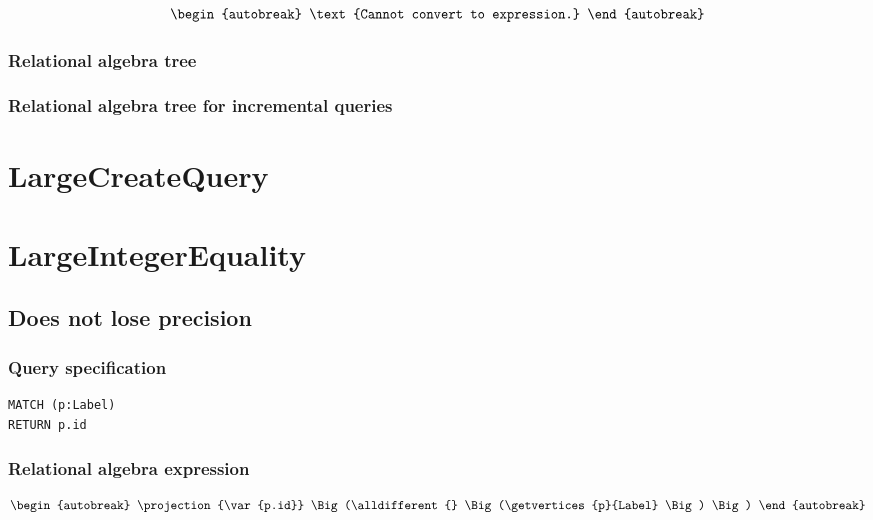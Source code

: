 \begin{align*}
\begin{autobreak}
\text{Cannot convert to expression.}
\end{autobreak}
\end{align*}

\subsubsection*{Relational algebra tree}


\subsubsection*{Relational algebra tree for incremental queries}

\section{LargeCreateQuery}

\section{LargeIntegerEquality}


\subsection{Does not lose precision}

\subsubsection*{Query specification}

\begin{lstlisting}
MATCH (p:Label)
RETURN p.id
\end{lstlisting}

\subsubsection*{Relational algebra expression}

\begin{align*}
\begin{autobreak}
\projection{\var{p.id}} \Big(\alldifferent{} \Big(\getvertices{p}{Label}
\Big)
\Big)
\end{autobreak}
\end{align*}

